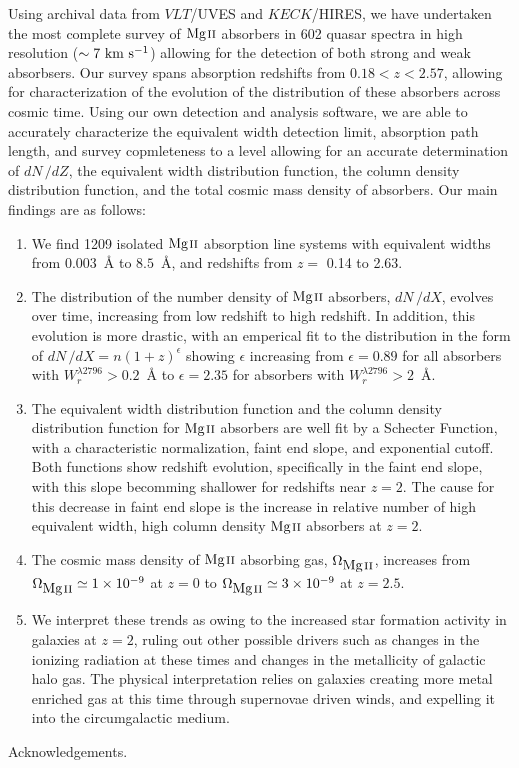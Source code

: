 \documentclass[iop,apj,numberedappendix,appendixfloats,twocolappendix]{emulateapj}
\begin{document}
Using archival data from $VLT$/UVES and $KECK$/HIRES, we have undertaken the most complete survey of ${\hbox{{\rm Mg}\kern 0.1em{\sc ii}}}$ absorbers in 602 quasar spectra in high resolution ($\sim 7~\mathrm{\hbox{km~s$^{-1}$}}$) allowing for the detection of both strong and weak {\MgII} absorbsers. Our survey spans absorption redshifts from $0.18 < z < 2.57$, allowing for characterization of the evolution of the distribution of these absorbers across cosmic time. Using our own detection and analysis software, we are able to accurately characterize the equivalent width detection limit, absorption path length, and survey copmleteness to a level allowing for an accurate determination of $dN\,/dZ$, the equivalent width distribution function, the column density distribution function, and the total cosmic mass density of {\MgII} absorbers. Our main findings are as follows:

\begin{enumerate}
\item We find 1209 isolated ${\hbox{{\rm Mg}\kern 0.1em{\sc ii}}}$ absorption line systems with equivalent widths from $0.003$~{\AA} to $8.5$~{\AA}, and redshifts from $z =$ 0.14 to 2.63. 
\item The distribution of the number density of ${\hbox{{\rm Mg}\kern 0.1em{\sc ii}}}$ absorbers, $dN\,/dX$, evolves over time, increasing from low redshift to high redshift. In addition, this evolution is more drastic, with an emperical fit to the distribution in the form of $dN\,/dX = n(1 + z)^{\epsilon}$ showing $\epsilon$ increasing from $\epsilon=0.89$ for all absorbers with $W_r^{\lambda2796} > 0.2$~{\AA} to $\epsilon=2.35$ for absorbers with $W_r^{\lambda2796} > 2$~{\AA}. 
\item The equivalent width distribution function and the column density distribution function for ${\hbox{{\rm Mg}\kern 0.1em{\sc ii}}}$ absorbers are well fit by a Schecter Function, with a characteristic normalization, faint end slope, and exponential cutoff. Both functions show redshift evolution, specifically in the faint end slope, with this slope becomming shallower for redshifts near $z = 2$. The cause for this decrease in faint end slope is the increase in relative number of high equivalent width, high column density ${\hbox{{\rm Mg}\kern 0.1em{\sc ii}}}$ absorbers at $z = 2$. 
\item The cosmic mass density of ${\hbox{{\rm Mg}\kern 0.1em{\sc ii}}}$ absorbing gas, $\Omega_{\hbox{{\rm Mg}\kern 0.1em{\sc ii}}}$, increases from $\Omega_{\hbox{{\rm Mg}\kern 0.1em{\sc ii}}} \simeq 1\times10^{-9}$ at $z = 0$ to $\Omega_{\hbox{{\rm Mg}\kern 0.1em{\sc ii}}} \simeq 3\times10^{-9}$ at $z = 2.5$.
\item We interpret these trends as owing to the increased star formation activity in galaxies at $z = 2$, ruling out other possible drivers such as changes in the ionizing radiation at these times and changes in the metallicity of galactic halo gas. The physical interpretation relies on galaxies creating more metal enriched gas at this time through supernovae driven winds, and expelling it into the circumgalactic medium. 
\end{enumerate}

Acknowledgements.



\end{document}
